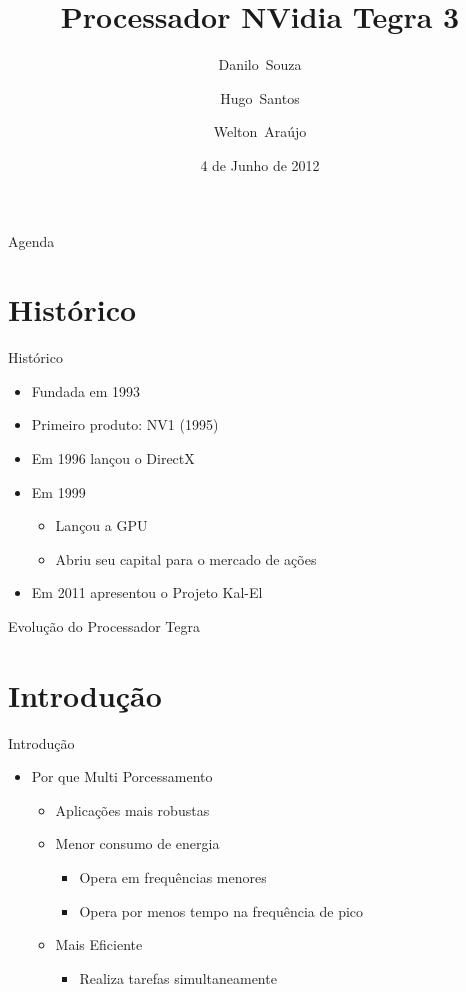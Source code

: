 \documentclass{beamer}
\title[Tegra 3]{%
Processador NVidia Tegra 3%
}
\author[Souza,Santos,Ara\'ujo]{
     Danilo~Souza\and
     Hugo~Santos\and
     Welton~Ara\'ujo
     }
\institute[Bel\'em]{
  \inst{1}%
  Universidade Federal do Par\'a
  }
\date[Bel\ém 2012]{
  4 de Junho de 2012
  }
\begin{document}
\begin{frame}
  \titlepage
\end{frame}

\begin{frame}{Agenda}
  \tableofcontents
\end{frame}

\section{Hist\'orico}
 \begin{frame}{Hist\'orico}
  \begin{itemize}
    \item  Fundada em 1993
    \item  Primeiro produto: NV1 (1995)
    \item  Em 1996 lan\c{c}ou o DirectX
    \item  Em 1999
    \begin{itemize}
     \item Lan\c{c}ou a GPU
     \item Abriu seu capital para o mercado de a\c{c}\~oes
    \end{itemize}
    \item Em 2011 apresentou o Projeto Kal-El
  \end{itemize}
\end{frame}

\begin{frame}{Evolu\c{c}\~ao do Processador Tegra}
\end{frame}


\section{Introdu\c{c}\~ao}
\begin{frame}{Introdu\c{c}\~ao}
  \begin{itemize}
    \item Por que Multi Porcessamento
    \begin{itemize}
      \item Aplica\c{c}\~oes mais robustas
      \item Menor consumo de energia
      \begin{itemize}
	\item Opera em frequ\^encias menores
	\item Opera por menos tempo na frequ\^encia de pico
      \end{itemize}
    \item Mais Eficiente
    \begin{itemize}
      \item Realiza tarefas simultaneamente
    \end{itemize}
   \end{itemize}
  \end{itemize}
\end{frame}
\end{document}
